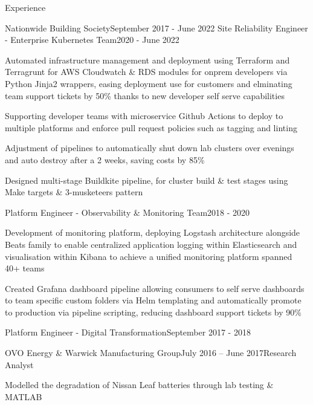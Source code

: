\documentclass{resume} %
\begin{document}
\begin{rSection}{Experience}
\begin{rSubsection}{Nationwide Building Society}{September 2017 - June 2022}
\normalfont
{Site Reliability Engineer - Enterprise Kubernetes Team}{2020 - June 2022}
\normalfont
\item Automated infrastructure management and deployment using Terraform and Terragrunt for AWS Cloudwatch \& RDS modules for onprem developers via Python Jinja2 wrappers, easing deployment use for customers and elminating team support tickets by 50\% thanks to new developer self serve capabilities %
\item Supporting developer teams with microservice Github Actions to deploy to multiple platforms and enforce pull request policies such as tagging and linting %
\item Adjustment of pipelines to automatically shut down lab clusters over evenings and auto destroy after a 2 weeks, saving costs by 85\% %
\item Designed multi-stage Buildkite pipeline, for cluster build \& test stages using Make targets \& 3-musketeers pattern %
\end{rSubsection}

\begin{rSubsection}{}{}{Platform Engineer - Observability \& Monitoring Team}{2018 - 2020}
\normalfont
\item Development of monitoring platform, deploying Logstash architecture alongside Beats family to enable centralized application logging within Elasticsearch and visualisation within Kibana to achieve a unified monitoring platform spanned 40+ teams %
\item Created Grafana dashboard pipeline allowing consumers to self serve dashboards to team specific custom folders via Helm templating and automatically promote to production via pipeline scripting, reducing dashboard support tickets by 90\% %
\end{rSubsection}

\begin{rSubsection}{}{}{Platform Engineer - Digital Transformation}{September 2017 - 2018}
\normalfont
\end{rSubsection}

\begin{rSubsection}{OVO Energy \& Warwick Manufacturing Group}{July 2016 – June 2017}{Research Analyst}{}
\normalfont
\item Modelled the degradation of Nissan Leaf batteries through lab testing \& MATLAB %
\end{rSubsection}

\end{rSection}

\end{document}
